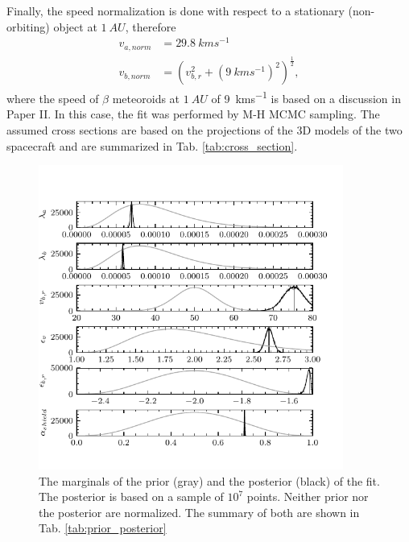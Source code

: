 Finally, the speed normalization is done with respect to a stationary (non-orbiting) object at $\SI{1}{AU}$, therefore
\begin{equation}\begin{split}
    v_{a,norm} & = \SI{29.8}{kms^{-1}} \\
    v_{b,norm} & = \left( v_{b,r}^2 + \left(\SI{9}{kms^{-1}}\right)^2 \right)^\frac{1}{2},
\end{split}\end{equation}
where the speed of $\beta$ meteoroids at $\SI{1}{AU}$ of \SI{9}{kms^{-1}} is based on a discussion in Paper II. In this case, the fit was performed by M-H MCMC sampling. The assumed cross sections are based on the projections of the 3D models \citep{psp_model,solo_model} of the two spacecraft and are summarized in Tab. \ref{tab:cross_section}.

\begin{figure}[t]
 	\centering
 	\includegraphics[width=10cm]{figures/both_shield.pdf}
 	\caption{The marginals of the prior (gray) and the posterior (black) of the fit. The posterior is based on a sample of $10^7$ points. Neither prior nor the posterior are normalized. The summary of both are shown in Tab. \ref{tab:prior_posterior}}
 	\label{fig:fit_posteriors}
\end{figure}

